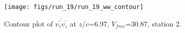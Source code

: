 \begin{figure}[H]
\centering
\texttt{[image: figs/run\_19/run\_19\_ww\_contour]}
\caption{Contour plot of $\overline{v_{z}^{\prime} v_{z}^{\prime}}$ at $z/c$=6.97, $V_{free}$=30.87, station 2.}
\label{fig:run_19_ww_contour}
\end{figure}



